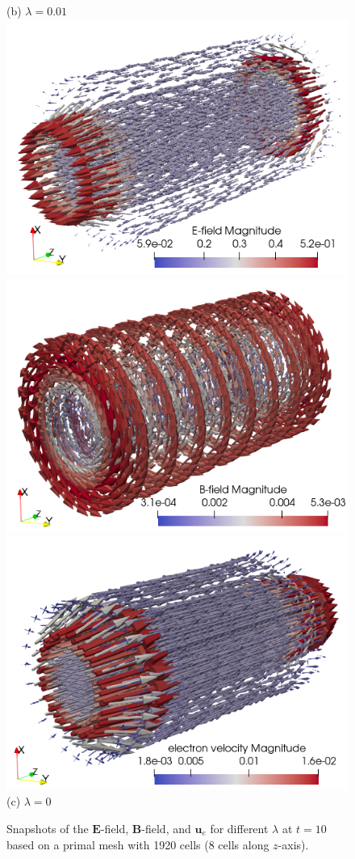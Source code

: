 \documentclass{article}
\begin{document}
\begin{figure}
    (b) $\lambda = 0.01$ \\
    \includegraphics[scale=0.35]{E_lambda_0.png}
    \includegraphics[scale=0.35]{B_lambda_0.png}
    \includegraphics[scale=0.35]{ue_lambda_0.png} \\
    (c) $\lambda = 0$
    \caption{Snapshots of the $\mathbf{E}$-field, $\mathbf{B}$-field, and $\mathbf{u}_e$ for different $\lambda$ at $t = 10$ based on a primal mesh with 1920 cells (8 cells along $z$-axis). } 
    \label{fig:3d_vec_field_E_B_ue}
\end{figure}
\end{document}

